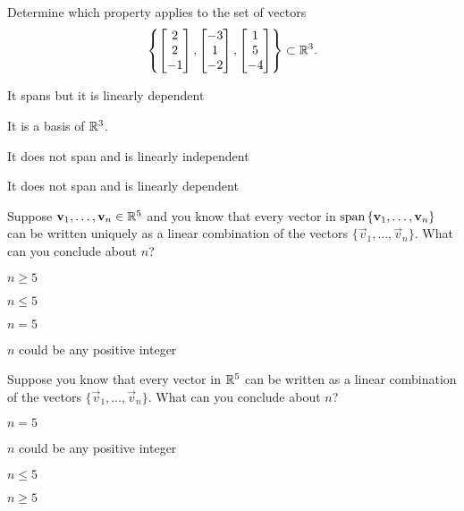 \documentclass{article}
\begin{document}
\begin{readinessAssuranceTest}
\item Determine which property applies to the set of vectors $$\left\{ \begin{bmatrix}  2 \\ 2 \\ -1 \end{bmatrix}, \begin{bmatrix} -3 \\ 1 \\ -2 \end{bmatrix} , \begin{bmatrix} 1 \\ 5 \\ -4 \end{bmatrix}\right\}\subset \IR^3.$$
\begin{readinessAssuranceTestChoices}
\item It spans but it is linearly dependent
\item It is a basis of $\IR^3$.
\item It does not span and is linearly independent
\item It does not span and is linearly dependent %
\end{readinessAssuranceTestChoices}


\item Suppose $\vec{v}_1, \ldots, \vec{v}_n \in \IR^5$ and you know that every vector in ${\rm span} \left\{ \vec{v}_1, \ldots, \vec{v}_n\right\}$ can be written uniquely as a linear combination of the vectors $\{\vec{v}_1, \ldots, \vec{v}_n\}$.  What can you conclude about $n$?
\begin{readinessAssuranceTestChoices}
\item $n \geq 5$
\item $n \leq 5$
\item $n=5$
\item $n$ could be any positive integer
\end{readinessAssuranceTestChoices}

\item Suppose you know that every vector in $\IR^5$ can be written as a linear combination of the vectors $\{\vec{v}_1, \ldots, \vec{v}_n\}$.  What can you conclude about $n$?
\begin{readinessAssuranceTestChoices}
\item $n=5$
\item $n$ could be any positive integer
\item $n \leq 5$
\item $n \geq 5$
\end{readinessAssuranceTestChoices}


\end{readinessAssuranceTest}
\end{document}
